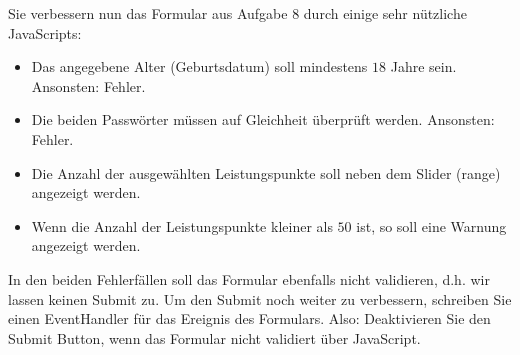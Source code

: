 %
\par Sie verbessern nun das Formular aus Aufgabe 8 durch einige sehr nützliche
JavaScripts:
%
\begin{itemize}
\item
Das angegebene Alter (Geburtsdatum) soll mindestens $18$ Jahre sein. Ansonsten:
Fehler.
\item
Die beiden Passwörter müssen auf Gleichheit überprüft werden. Ansonsten:
Fehler.
\item
Die Anzahl der ausgewählten Leistungspunkte soll neben dem Slider (range)
angezeigt werden.
\item
Wenn die Anzahl der Leistungspunkte kleiner als $50$ ist, so soll eine Warnung
angezeigt werden.
\end{itemize}
%
\par In den beiden Fehlerfällen soll das Formular ebenfalls nicht validieren,
d.h. wir lassen keinen Submit zu. Um den Submit noch weiter zu verbessern,
schreiben Sie einen EventHandler für das  Ereignis des Formulars.
Also: Deaktivieren Sie den Submit Button, wenn das Formular nicht validiert über
JavaScript.